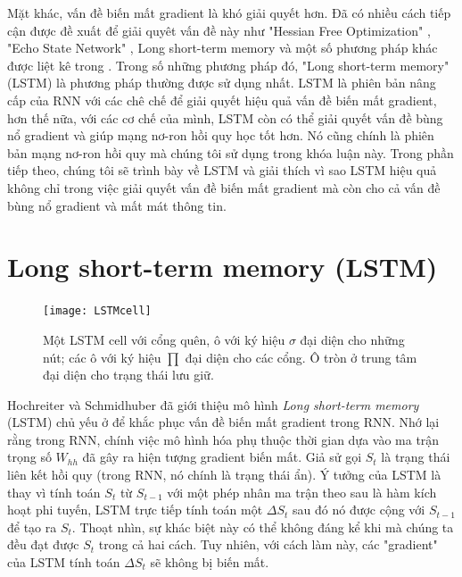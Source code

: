 Mặt khác, vấn đề biến mất gradient là khó giải quyết hơn. Đã có nhiều cách tiếp cận được đề xuất để giải quyêt vấn đề này như "Hessian Free Optimization" \cite{martens2011}, "Echo State Network" \cite{jaeger2007}, Long short-term memory \cite{hochreiter1997} và một số phương pháp khác được liệt kê trong \cite{bengio2013}. Trong số những phương pháp đó, "Long short-term memory" (LSTM) là phương pháp thường được sử dụng nhất. LSTM là phiên bản nâng cấp của RNN với các chê chế để giải quyết hiệu quả vấn đề biến mất gradient, hơn thế nữa, với các cơ chế của mình, LSTM còn có thể giải quyết vấn đề bùng nổ gradient và giúp mạng nơ-ron hồi quy học tốt hơn. Nó cũng chính là phiên bản mạng nơ-ron hồi quy mà chúng tôi sử dụng trong khóa luận này. Trong phần tiếp theo, chúng tôi sẽ trình bày về LSTM và giải thích vì sao LSTM hiệu quả không chỉ trong việc giải quyết vấn đề biến mất gradient mà còn cho cả vấn đề bùng nổ gradient và mất mát thông tin.

\section{Long short-term memory (LSTM)}

\begin{figure}
	\centering
	\texttt{[image: LSTMcell]}
	\caption[Một LSTM cell]{Một LSTM cell với cổng quên, ô với ký hiệu $\sigma$ đại diện cho những nút; các ô với ký hiệu $\prod$ đại diện cho các cổng. Ô tròn ở trung tâm đại diện cho trạng thái lưu giữ.}
	\label{fig_lstmCell}
\end{figure}

Hochreiter và Schmidhuber \cite{hochreiter1997} đã giới thiệu mô hình \textit{Long short-term memory} (LSTM) chủ yếu ở để khắc phục vấn đề biến mất gradient trong RNN. Nhớ lại rằng trong RNN, chính việc mô hình hóa phụ thuộc thời gian dựa vào ma trận trọng số $W_{hh}$ đã gây ra hiện tượng gradient biến mất. Giả sử gọi $S_t$ là trạng thái liên kết hồi quy (trong RNN, nó chính là trạng thái ẩn). Ý tưởng của LSTM là thay vì tính toán $S_t$ từ $S_{t-1}$ với một phép nhân ma trận theo sau là hàm kích hoạt phi tuyến, LSTM trực tiếp tính toán một $\Delta S_t$ sau đó nó được cộng với $S_{t-1}$ để tạo ra $S_t$. Thoạt nhìn, sự khác biệt này có thể không đáng kể khi mà chúng ta đều đạt được $S_t$ trong cả hai cách. Tuy nhiên, với cách làm này, các "gradient" của LSTM tính toán $\Delta S_t$ sẽ không bị biến mất.

